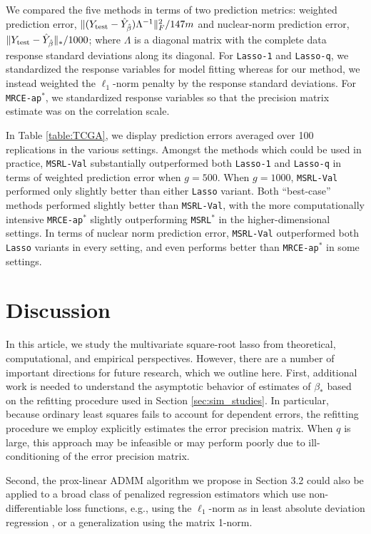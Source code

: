 \documentclass[12pt]{article}
\begin{document}
We compared the five methods in terms of two prediction metrics: weighted prediction error, $\|(Y_{\rm test} - \hat{Y}_{\hat{\beta}}) \Lambda^{-1}\|_F^2/147 m$ and nuclear-norm prediction error, $\|Y_{\rm test} - \hat{Y}_{\hat{\beta}}\|_*/1000$; where $\Lambda$ is a diagonal matrix with the complete data response standard deviations along its diagonal. For \texttt{Lasso-1} and \texttt{Lasso-q}, we standardized the response variables for model fitting whereas for our method, we instead weighted the $\ell_1$-norm penalty by the response standard deviations. For \texttt{MRCE-ap}$^*$, we standardized response variables so that the precision matrix estimate was on the correlation scale. 

In Table \ref{table:TCGA}, we display prediction errors averaged over 100 replications in the various settings. Amongst the methods which could be used in practice, \texttt{MSRL-Val} substantially outperformed both \texttt{Lasso-1} and \texttt{Lasso-q} in terms of weighted prediction error when $g = 500$. When $g = 1000$, \texttt{MSRL-Val} performed only slightly better than either \texttt{Lasso} variant. Both ``best-case'' methods performed slightly better than \texttt{MSRL-Val}, with the more computationally intensive \texttt{MRCE-ap}$^*$ slightly outperforming \texttt{MSRL}$^*$ in the higher-dimensional settings. In terms of nuclear norm prediction error, \texttt{MSRL-Val} outperformed both \texttt{Lasso} variants in every setting, and even performs better than \texttt{MRCE-ap}$^*$ in some settings. 

\section{Discussion}
In this article, we study the multivariate square-root lasso from theoretical, computational, and empirical perspectives. However, there are a number of important directions for future research, which we outline here. First, additional work is needed to understand the asymptotic behavior of estimates of $\beta_*$ based on the refitting procedure used in Section \ref{sec:sim_studies}. In particular, because ordinary least squares fails to account for dependent errors, the refitting procedure we employ explicitly estimates the error precision matrix. When $q$ is large, this approach may be infeasible or may perform poorly due to ill-conditioning of the error precision matrix. 

Second, the prox-linear ADMM algorithm we propose in Section 3.2 could also be applied to a broad class of penalized regression estimators which use non-differentiable loss functions, e.g., using the $\ell_1$-norm as in least absolute deviation regression \citep{WANG2013135}, or a generalization using the matrix 1-norm. 
\end{document}
